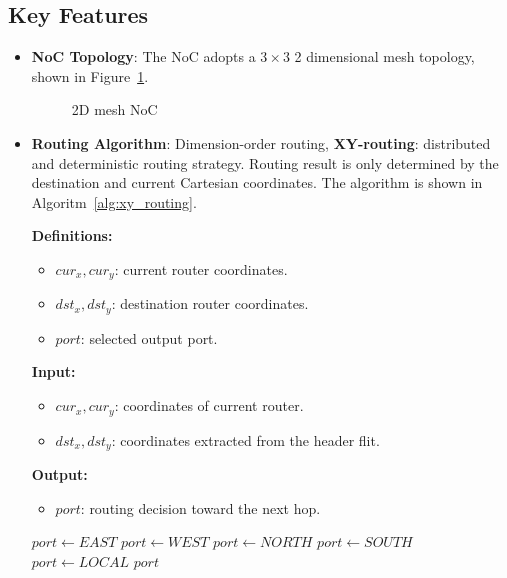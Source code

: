 \documentclass[11pt,a4paper]{article}
\begin{document}
\subsection{Key Features}
\begin{itemize}
    \item \textbf{NoC Topology}: The NoC adopts a \(3\times3\) 2 dimensional mesh topology, shown in Figure~\ref{fig:mesh}.
\begin{figure}[htbp]
    \centering
     

    \caption{2D mesh NoC}
    \label{fig:mesh}
\end{figure}
    \item \textbf{Routing Algorithm}: Dimension-order routing, \textbf{XY-routing}: distributed and deterministic routing strategy. Routing result is only determined by the destination and current Cartesian coordinates. The algorithm is shown in Algoritm~\ref{alg:xy_routing}.

\begin{algorithm}[t]
\caption{Pseudo code of the XY-routing computation}
\label{alg:xy_routing}

\textbf{Definitions:}
\begin{itemize}
    \item $cur_x, cur_y$: current router coordinates.
    \item $dst_x, dst_y$: destination router coordinates.
    \item $port$: selected output port.
\end{itemize}

\textbf{Input:}
\begin{itemize}
    \item $cur_x, cur_y$: coordinates of current router.
    \item $dst_x, dst_y$: coordinates extracted from the header flit.
\end{itemize}

\textbf{Output:}
\begin{itemize}
    \item $port$: routing decision toward the next hop.
\end{itemize}

\begin{algorithmic}[1]
    \State $port \gets EAST$
    \State $port \gets WEST$
    \State $port \gets NORTH$
    \State $port \gets SOUTH$
\Else
    \State $port \gets LOCAL$
\EndIf
\State \Return $port$
\end{algorithmic}
\end{algorithm}


\end{itemize}
\end{document}
